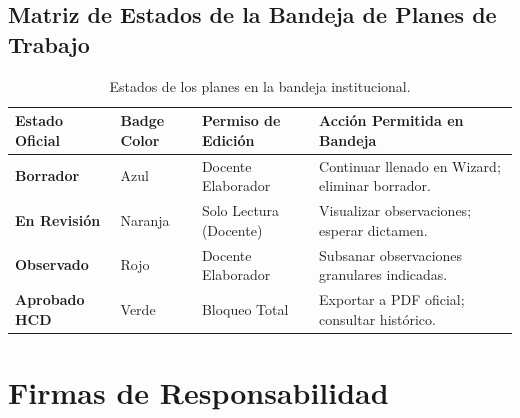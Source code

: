 \documentclass[12pt,a4paper]{article}
\begin{document}
\subsection{Matriz de Estados de la Bandeja de Planes de Trabajo}
\begin{table}[H]
\centering
\small
\renewcommand{\arraystretch}{1.2}
\begin{tabularx}{\textwidth}{|>{\hsize=0.9\hsize\raggedright\arraybackslash\bfseries\footnotesize}X|>{\hsize=0.5\hsize\centering\arraybackslash\footnotesize}X|>{\hsize=0.5\hsize\centering\arraybackslash\footnotesize}X|>{\hsize=2.1\hsize\raggedright\arraybackslash\footnotesize}X|}
\hline
\rowcolor{tableheader}
\textbf{Estado Oficial} & \textbf{Badge Color} & \textbf{Permiso de Edición} & \textbf{Acción Permitida en Bandeja} \\
\hline
\textbf{Borrador} & Azul & Docente Elaborador & Continuar llenado en Wizard; eliminar borrador. \\
\hline
\textbf{En Revisión} & Naranja & Solo Lectura (Docente) & Visualizar observaciones; esperar dictamen. \\
\hline
\textbf{Observado} & Rojo & Docente Elaborador & Subsanar observaciones granulares indicadas. \\
\hline
\textbf{Aprobado HCD} & Verde & Bloqueo Total & Exportar a PDF oficial; consultar histórico. \\
\hline
\end{tabularx}
\caption{Estados de los planes en la bandeja institucional.}
\end{table}

\section{Firmas de Responsabilidad}
\end{document}
